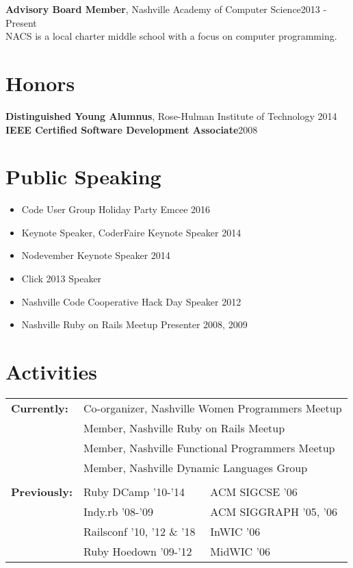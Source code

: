 \documentclass[line, margin, 10pt]{res}
\begin{document}
\begin{resume}
{\bf Advisory Board Member}, Nashville Academy of Computer Science\hfill 2013 - Present\\
NACS is a local charter middle school with a focus on computer programming.

\section{Honors}

{\bf Distinguished Young Alumnus}, Rose-Hulman Institute of Technology \hfill 2014\\
{\bf IEEE Certified Software Development Associate}\hfill 2008

\section{Public Speaking}

\begin{itemize}\itemsep -2pt
  \item Code User Group Holiday Party Emcee 2016
  \item Keynote Speaker, CoderFaire Keynote Speaker 2014
  \item Nodevember Keynote Speaker 2014
  \item Click 2013 Speaker
  \item Nashville Code Cooperative Hack Day Speaker 2012
  \item Nashville Ruby on Rails Meetup Presenter 2008, 2009
\end{itemize}

\section{Activities}
\begin{tabular}[t]{@{} p{1.2in} p{1.9in} p{1.9in} @{}}
\bf{Currently:}

& \multicolumn{2}{p{3.8in}}{ Co-organizer, Nashville Women Programmers Meetup} \\
& \multicolumn{2}{p{3.8in}}{ Member, Nashville Ruby on Rails Meetup} \\
& \multicolumn{2}{p{3.8in}}{ Member, Nashville Functional Programmers Meetup} \\
& \multicolumn{2}{p{3.8in}}{ Member, Nashville Dynamic Languages Group} \\
\\
\bf{Previously:}
& Ruby DCamp '10-'14 & ACM SIGCSE '06  \\
& Indy.rb '08-'09 & ACM SIGGRAPH '05, '06 \\
& Railsconf '10, '12 \& '18 &  InWIC '06 \\
& Ruby Hoedown '09-'12 & MidWIC '06 \\
\end{tabular}
\end{resume}
\end{document}
